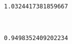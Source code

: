 \documentclass[11pt]{article}
\begin{document}
    \begin{Verbatim}[commandchars=\\\{\}]
1.0324417381859667

    \end{Verbatim}

    \begin{center}
    \end{center}
    { \hspace*{\fill} \\}
    
    \begin{Verbatim}[commandchars=\\\{\}]
0.9498352409202234

    \end{Verbatim}
\end{document}
